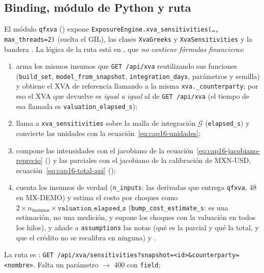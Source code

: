 \begin{sloppypar}
\subsection{Binding, módulo de Python y ruta}\label{sec:cap16-ruta}

El módulo \texttt{qfxva} () expone
\texttt{ExposureEngine.xva\_sensitivities(\dots, max\_threads=2)} (suelta el GIL), las clases \texttt{XvaGreeks} y
\texttt{XvaSensitivities} y la bandera . La lógica de la ruta
está en , que \emph{no contiene fórmulas financieras}:
\begin{enumerate}
  \item arma los mismos insumos que \texttt{GET /api/xva} reutilizando sus funciones (\texttt{build\_set},
        \texttt{model\_from\_snapshot}, \texttt{integration\_days}, parámetros y semilla) y obtiene el XVA de referencia
        llamando a la misma \texttt{xva.\_counterparty}; por eso el XVA que devuelve es \emph{igual a igual} al de
        \texttt{GET /api/xva} (el tiempo de esa llamada es \texttt{valuation\_elapsed\_s});
  \item llama a \texttt{xva\_sensitivities} sobre la malla de integración $\mathcal G$ (\texttt{elapsed\_s}) y
        convierte las unidades con la ecuación~\eqref{eq:cap16-unidades};
  \item compone las intensidades con el jacobiano de la ecuación~\eqref{eq:cap16-jacobiano-reprecio}
        () y las parciales con el jacobiano de la calibración de MXN-USD,
        ecuación~\eqref{eq:cap16-total-api} ();
  \item cuenta los insumos de verdad (\texttt{n\_inputs}: las derivadas que entrega \texttt{qfxva}, 48 en MX-DEMO) y
        estima el costo por choques como $2\times n_{\mathrm{insumos}}\times\texttt{valuation\_elapsed\_s}$
        (\texttt{bump\_cost\_estimate\_s}: es una estimación, no una medición, y supone los choques con la valuación en
        todos los hilos), y añade a \texttt{assumptions} las notas 
        (qué es la parcial y qué la total, y que el crédito no se recalibra en ninguna) y
        .
\end{enumerate}
La ruta es :
\texttt{GET /api/xva/sensitivities?snapshot=<id>\&counterparty=<nombre>}. Falta un parámetro $\to$ 400 con \texttt{field};

\end{sloppypar}
